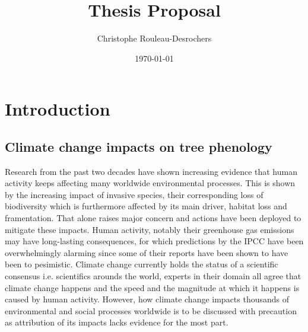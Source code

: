 \documentclass{article}
\title{Thesis Proposal}
\date{\today}
\author{Christophe Rouleau-Desrochers}
\begin{document}

\maketitle


\section{Introduction}
\subsection{Climate change impacts on tree phenology}
Research from the past two decades have shown increasing evidence that human activity keeps affecting many worldwide environmental processes. This is shown by the increasing impact of invasive species, their corresponding loss of biodiversity which is furthermore affected by its main driver, habitat loss and framentation. That alone raises major concern and actions have been deployed to mitigate these impacts. Human activity, notably their greenhouse gas emissions may have long-lasting consequences, for which predictions by the IPCC have been overwhelmingly alarming since some of their reports have been shown to have been to pesimistic. Climate change currently holds the status of a scientific consensus i.e. scientifics arounds the world, experts in their domain all agree that climate change happens and the speed and the magnitude at which it happens is caused by human activity. However, how climate change impacts thousands of environmental and social processes worldwide is to be discussed with precaution as attribution of its impacts lacks evidence for the most part. 
\end{document}
